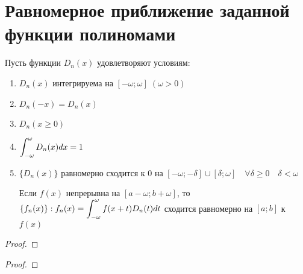 \section{Равномерное приближение заданной функции полиномами}

\begin{theorem}
    Пусть функции $D_n(x)$ удовлетворяют условиям:

    \begin{enumerate}
        \item $D_n(x)$ интегрируема на $[-\omega; \omega] \; (\omega > 0)$
        \item $D_n(-x) = D_n(x)$
        \item $D_n(x \geq 0)$
        \item $\displaystyle\int_{-\omega}^\omega D_n(x) dx = 1$
        \item 
            $\{ D_n(x) \}$ равномерно сходится к $0$ на 
            $[-\omega; -\delta] \cup [\delta; \omega] \quad
            \forall \delta \geq 0 \quad \delta < \omega$

            Если $f(x)$ непрерывна на $[a - \omega; b + \omega]$, то
            $\{ f_n(x) \} : f_n(x) = 
            \displaystyle\int_{-\omega}^\omega f(x + t) D_n(t) dt$ сходится равномерно 
            на $[a; b]$ к $f(x)$
    \end{enumerate}
\end{theorem}
\begin{proof}
    
\end{proof}

\begin{remark}
    
\end{remark}


\begin{theorem}
    
\end{theorem}
\begin{proof}
    
\end{proof}


\begin{theorem}
    
\end{theorem}

